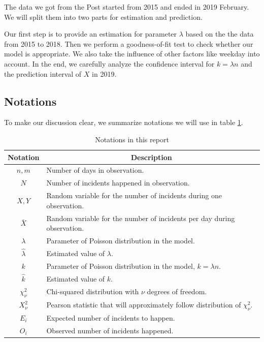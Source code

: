 \documentclass[11pt,a4paper,english]{article}
\begin{document}
The data we got from the Post started from 2015 and ended in 2019 February. We will split them into two parts for estimation and prediction.

Our first step is to provide an estimation for parameter $\lambda$ based on the the data from 2015 to 2018. 
Then we perform a goodness-of-fit test to check whether our model is appropriate. 
We also take the influence of other factors like weekday into account. 
In the end, we carefully analyze the confidence interval for $k = \lambda n$ and the prediction interval of $X$ in 2019. 

\subsection{Notations}
To make our discussion clear, we summarize notations we will use in table \ref{tab:notation}.
\begin{table}[htbp]
	\centering
	\begin{tabular}{cl}
		\toprule
		Notation & \multicolumn{1}{c}{Description}\\
		\midrule
		$n,m$ & Number of days in observation.\\
		$N$ & Number of incidents happened in observation.\\
		$X,Y$ & Random variable for the number of incidents during one observation.\\
		$\bar{X}$ & Random variable for the number of incidents per day during observation.\\
		$\lambda$ & Parameter of Poisson distribution in the model.\\
		$\hat{\lambda}$ & Estimated value of $\lambda$.\\
		$k$ & Parameter of Poisson distribution in the model, $k = \lambda n$.\\
		$\hat{k}$ & Estimated value of $k$.\\
		$\chi_{\nu}^{2}$ & Chi-squared distribution with $\nu$ degrees of freedom.\\
		$X^{2}_{\nu}$ & Pearson statistic that will approximately follow distribution of $\chi^{2}_{\nu}$.\\
		$E_{i}$ & Expected number of incidents to happen.\\
		$O_{i}$ & Observed number of incidents happened.\\
		\bottomrule
	\end{tabular}
	\caption{Notations in this report}
	\label{tab:notation}
\end{table}
\end{document}
